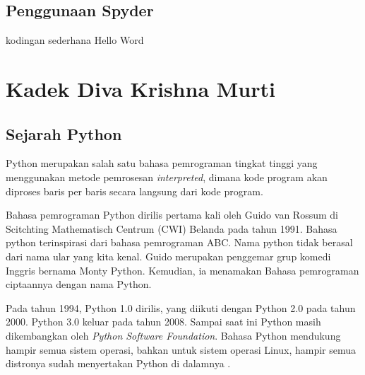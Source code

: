 \subsection{Penggunaan Spyder}
kodingan sederhana Hello Word


\section{Kadek Diva Krishna Murti}

\subsection{Sejarah Python}
Python merupakan salah satu bahasa pemrograman tingkat tinggi yang menggunakan metode pemrosesan \textit{interpreted}, dimana kode program akan diproses baris per baris secara langsung dari kode program.

Bahasa pemrograman Python dirilis pertama kali oleh Guido van Rossum di Scitchting Mathematisch Centrum (CWI) Belanda pada tahun 1991. Bahasa python terinspirasi dari bahasa pemrograman ABC. Nama python tidak berasal dari nama ular yang kita kenal. Guido merupakan penggemar grup komedi Inggris bernama Monty Python. Kemudian, ia menamakan Bahasa pemrograman ciptaannya dengan nama Python.

Pada tahun 1994, Python 1.0 dirilis, yang diikuti dengan Python 2.0 pada tahun 2000. Python 3.0 keluar pada tahun 2008. Sampai saat ini Python masih dikembangkan oleh \textit{Python Software Foundation}. Bahasa Python mendukung hampir semua sistem operasi, bahkan untuk sistem operasi Linux, hampir semua distronya sudah menyertakan Python di dalamnya \cite{roihan2017monitoring}.


